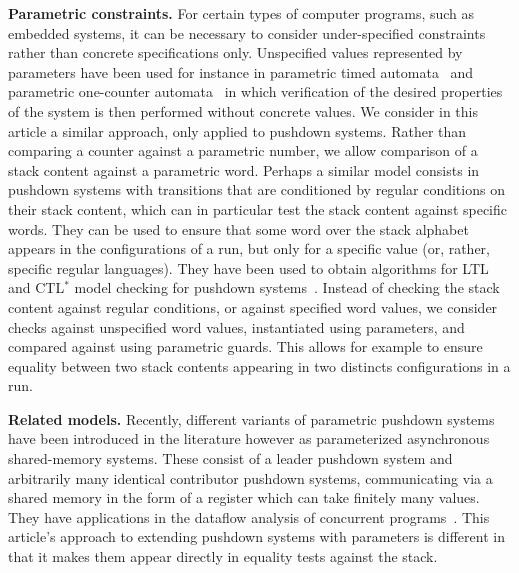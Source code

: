 \documentclass[a4paper,UKenglish,cleveref, autoref, thm-restate]{lipics-v2021}
\begin{document}
{\bf Parametric constraints.}
For certain types of computer programs, such as embedded systems, it can
be necessary to consider under-specified constraints rather than concrete specifications only.
Unspecified values represented by parameters have been used
for instance in parametric timed automata~\cite{AHV93-stoc} and parametric one-counter automata~\cite{haase2012complexity, lechner2015complexity} in which
verification of the desired properties of the system is then performed without concrete values.
 We consider in this article a similar approach, only applied to pushdown systems. Rather than comparing a counter against a parametric number, we allow comparison of a stack content against a parametric word.
  Perhaps a similar model consists in  pushdown systems with transitions that are conditioned by regular conditions on their stack content, which can in particular test the stack content against specific words. 
They can be used to ensure that some word over the stack alphabet appears in the configurations of a run, but only for a specific value (or, rather, specific regular languages).
They have  been used to  obtain  algorithms for LTL and CTL$^*$ model checking
for pushdown systems~\cite{finkel1997direct}.
Instead of checking the stack content against regular conditions, or against specified word values, we consider checks against unspecified word values, instantiated using parameters, and compared against using parametric guards.
This allows for example to ensure equality between two stack contents appearing in two distincts configurations in a run.



{\bf Related models.}
Recently, different variants of parametric pushdown systems have been introduced in the literature 
\cite{hague2011parameterised, esparza2016parameterized, fortin2017model} 
however as
parameterized asynchronous shared-memory systems.
These consist of a leader pushdown system
and arbitrarily many identical contributor pushdown systems, communicating via a shared memory
in the form of a register which can take finitely many values.
They have applications
in the dataflow analysis of concurrent programs~\cite{kahlon2008parameterization}. 
This article's approach to extending pushdown systems with parameters is different in that it makes them appear directly in equality tests against the stack.
\end{document}
